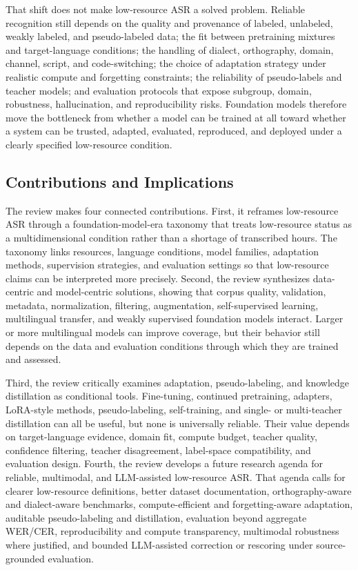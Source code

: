 \documentclass[pdflatex,sn-basic]{sn-jnl}
\theoremstyle{thmstyleone}
\theoremstyle{thmstyletwo}
\theoremstyle{thmstylethree}
\begin{document}
That shift does not make low-resource ASR a solved problem. Reliable recognition still depends on the quality and provenance of labeled, unlabeled, weakly labeled, and pseudo-labeled data; the fit between pretraining mixtures and target-language conditions; the handling of dialect, orthography, domain, channel, script, and code-switching; the choice of adaptation strategy under realistic compute and forgetting constraints; the reliability of pseudo-labels and teacher models; and evaluation protocols that expose subgroup, domain, robustness, hallucination, and reproducibility risks. Foundation models therefore move the bottleneck from whether a model can be trained at all toward whether a system can be trusted, adapted, evaluated, reproduced, and deployed under a clearly specified low-resource condition.

\subsection{Contributions and Implications}

The review makes four connected contributions. First, it reframes low-resource ASR through a foundation-model-era taxonomy that treats low-resource status as a multidimensional condition rather than a shortage of transcribed hours. The taxonomy links resources, language conditions, model families, adaptation methods, supervision strategies, and evaluation settings so that low-resource claims can be interpreted more precisely. Second, the review synthesizes data-centric and model-centric solutions, showing that corpus quality, validation, metadata, normalization, filtering, augmentation, self-supervised learning, multilingual transfer, and weakly supervised foundation models interact. Larger or more multilingual models can improve coverage, but their behavior still depends on the data and evaluation conditions through which they are trained and assessed.

Third, the review critically examines adaptation, pseudo-labeling, and knowledge distillation as conditional tools. Fine-tuning, continued pretraining, adapters, LoRA-style methods, pseudo-labeling, self-training, and single- or multi-teacher distillation can all be useful, but none is universally reliable. Their value depends on target-language evidence, domain fit, compute budget, teacher quality, confidence filtering, teacher disagreement, label-space compatibility, and evaluation design. Fourth, the review develops a future research agenda for reliable, multimodal, and LLM-assisted low-resource ASR. That agenda calls for clearer low-resource definitions, better dataset documentation, orthography-aware and dialect-aware benchmarks, compute-efficient and forgetting-aware adaptation, auditable pseudo-labeling and distillation, evaluation beyond aggregate WER/CER, reproducibility and compute transparency, multimodal robustness where justified, and bounded LLM-assisted correction or rescoring under source-grounded evaluation.
\end{document}

